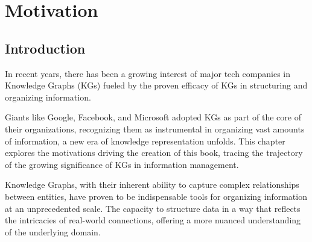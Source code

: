 \chapter{Motivation}\label{chap:motivation}







\section{Introduction}\label{sec:moti-intro}
In recent years, there has been a growing interest of major tech companies in Knowledge Graphs (KGs) fueled by the proven efficacy of KGs in structuring and organizing information.

Giants like Google, Facebook, and Microsoft adopted KGs as part of the core of their organizations, recognizing them as instrumental in organizing vast amounts of information, a new era of knowledge representation unfolds. This chapter explores the motivations driving the creation of this book, tracing the trajectory of the growing significance of KGs in information management.

Knowledge Graphs, with their inherent ability to capture complex relationships between entities, have proven to be indispensable tools for organizing information at an unprecedented scale. The capacity to structure data in a way that reflects the intricacies of real-world connections, offering a more nuanced understanding of the underlying domain.

